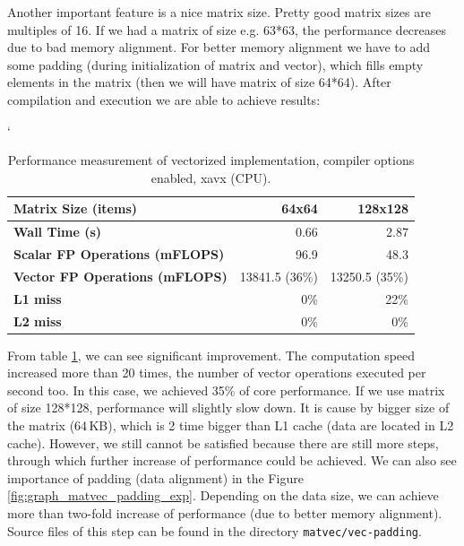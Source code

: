 Another important feature is a nice matrix size. Pretty good matrix sizes are multiples of 16. If we had a matrix of size e.g. 63*63, the performance  decreases due to bad memory alignment. For better memory alignment we have to add some padding (during initialization of matrix and vector), which fills empty elements in the matrix (then we will have matrix of size 64*64). After compilation and execution we are able to achieve results:

\begin{table}[ht]
\catcode`
\begin{center}
\begin{tabular}{| l | r | r |} \hline
\textbf{Matrix Size (items)} & 64x64 & 128x128\\ \hline
\textbf{Wall Time (s)} & 0.66 & 2.87\\ \hline
\textbf{Scalar FP Operations (mFLOPS)} & 96.9 & 48.3\\ \hline
\textbf{Vector FP Operations (mFLOPS)} & 13841.5 (36\%) & 13250.5 (35\%)\\ \hline
\textbf{L1 miss} & 0\% & 22\%\\ \hline
\textbf{L2 miss} & 0\% & 0\%\\ \hline
\end{tabular}
\caption{Performance measurement of vectorized implementation, compiler options enabled, xavx (CPU).}
\label{tab:table_matvec_vec_padding}
\end{center}
\end{table}

From table \ref{tab:table_matvec_vec_padding}, we can see significant improvement. The computation speed increased more than 20 times, the number of vector operations executed per second too. In this case, we achieved 35\% of core performance. If we use matrix of size 128*128, performance will slightly slow down. It is cause by bigger size of the matrix (64\,KB), which is 2 time bigger than L1 cache (data are located in L2 cache). However, we still cannot be satisfied because there are still more steps, through which further increase of performance could be achieved. We can also see importance of padding (data alignment) in the Figure \ref{fig:graph_matvec_padding_exp}. Depending on the data size, we can achieve more than two-fold increase of performance (due to better memory alignment). Source files of this step can be found in the directory \texttt{matvec/vec-padding}.


